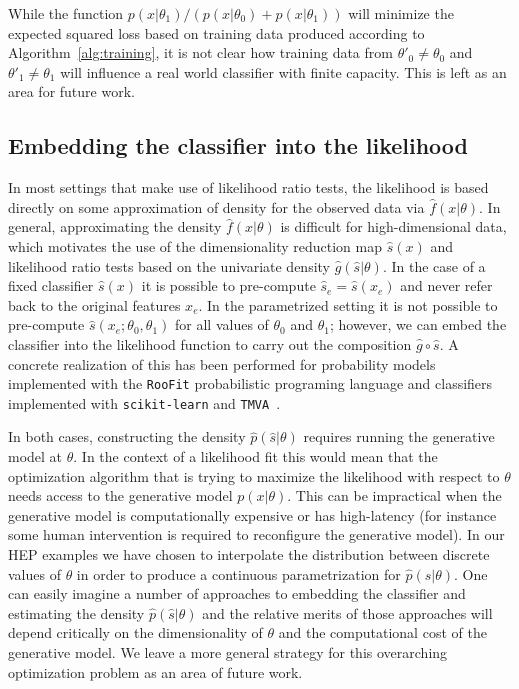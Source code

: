 \documentclass[11pt, oneside]{article}   	%
\begin{document}
While the function $p(x|\theta_1)/(p(x|\theta_0)+p(x|\theta_1))$ will minimize the expected squared loss based on 
training data produced according to Algorithm~\ref{alg:training}, it is not clear how training data from $\theta'_0 \ne \theta_0$ and $\theta'_1 \ne \theta_1$ will influence a real world classifier with finite capacity. This is left as an area for future work.

\subsection{Embedding the classifier into the likelihood}

In most settings that make use of likelihood ratio tests, the likelihood is based directly on some approximation of density for the observed data via $\hat{f}(x|\theta)$.  In general, approximating the density $\hat{f}(x|\theta)$ is difficult for high-dimensional data, which motivates the use of the dimensionality reduction map $\hat{s}(x)$ and likelihood ratio tests based on the univariate density $\hat{g}(\hat{s}|\theta)$.  In the case of a fixed classifier $\hat s(x)$ it is possible to pre-compute $\hat s_e=\hat s(x_e)$ and never refer back to the original features $x_e$. In the parametrized setting it is not possible to pre-compute $\hat s(x_e; \theta_0, \theta_1)$ for all values of $\theta_0$ and $\theta_1$; however, we can  embed the classifier into the likelihood function to carry out the composition $\hat{g}\circ \hat{s}$. A concrete realization of this has been performed for probability models implemented with the \texttt{RooFit} probabilistic programing language and  classifiers implemented with \texttt{scikit-learn} and \texttt{TMVA}~\citep{Verkerke:2003ir,scikit-learn,Hocker:2007ht}.

In both cases, constructing the density $\hat p(\hat s|\theta)$ requires running the generative model at $\theta$. In the context of a likelihood fit this would mean that the optimization algorithm that is trying to maximize the likelihood with respect to $\theta$ needs access to the generative model $p(x|\theta)$. This can be  impractical when the generative model is computationally expensive or has high-latency (for instance some human intervention is required to reconfigure the generative model).  In our HEP examples we have chosen to interpolate the distribution between discrete values of $\theta$ in order to produce a continuous parametrization for $\hat p(\hat s | \theta)$. 
One can easily imagine a number of approaches to embedding the classifier and estimating the density $\hat p(\hat s|\theta)$ and the relative merits of those approaches will depend critically on the dimensionality of $\theta$ and the computational cost of the generative model. We leave a more general strategy for this overarching optimization problem as an area of future work.
\end{document}

